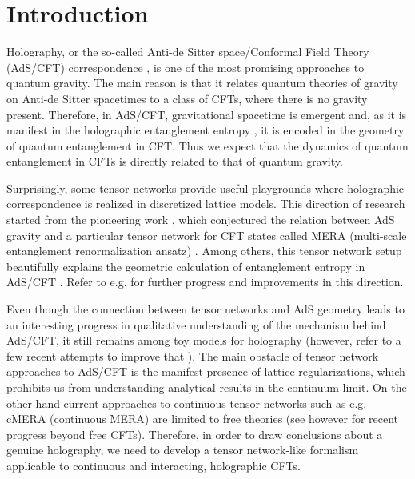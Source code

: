 \documentclass[a4paper,12pt]{article}
\begin{document}
\tableofcontents

\section{Introduction}

Holography, or the so-called Anti-de Sitter space/Conformal Field Theory (AdS/CFT) correspondence \cite{Ma}, is one of the most promising approaches to quantum gravity. The main reason is that it relates quantum theories of gravity on Anti-de Sitter spacetimes to a class of CFTs, where there is no gravity present. Therefore, in AdS/CFT, gravitational spacetime is emergent and, as it is manifest in the holographic entanglement entropy \cite{RT,HRT,Ra}, it is encoded in the geometry of quantum entanglement in CFT. Thus we expect that the dynamics of quantum entanglement in CFTs is directly related to that of quantum gravity. 

Surprisingly, some tensor networks provide useful playgrounds where holographic correspondence is realized in discretized lattice models. This direction of research started from the pioneering work \cite{Swingle}, which conjectured the relation between AdS gravity and a particular tensor network for CFT states called MERA (multi-scale entanglement renormalization ansatz) \cite{MERA,TNR,cMERA}. Among others, this tensor network setup beautifully explains the geometric calculation of entanglement entropy in AdS/CFT \cite{RT,HRT}. Refer to e.g. \cite{Qi:2013caa,HAPPY,HQ,Beny,NRT,MT,Cz,Czech:2015kbp,Milsted:2018yur,Milsted:2018san,Bhattacharyya:2016hbx,Hung:2018mcn,Chen:2021ipv,Jahn:2020ukq,Jahn:2021uqr} for further progress and improvements in this direction. 

Even though the connection between tensor networks and AdS geometry leads to an interesting progress in qualitative understanding of the mechanism behind AdS/CFT, it still remains among toy models for holography (however, refer to a few recent attempts to improve that \cite{Takayanagi:2018pml,VanRaamsdonk:2018zws,Bao:2018pvs,Bao:2019fpq,Caputa:2020fbc}). The main obstacle of tensor network approaches to AdS/CFT is the manifest presence of lattice regularizations, which prohibits us from understanding analytical results in the continuum limit. On the other hand current approaches to continuous tensor networks such as e.g. cMERA (continuous MERA) are limited to free theories (see however \cite{Cotler:2016dha,Cotler:2018ufx,Cotler:2018ehb,Fernandez-Melgarejo:2019sjo,Fernandez-Melgarejo:2020fzw} for recent progress beyond free CFTs). Therefore, in order to draw conclusions about a genuine holography, we need to develop a tensor network-like formalism applicable to continuous and interacting, holographic CFTs.
\end{document}
